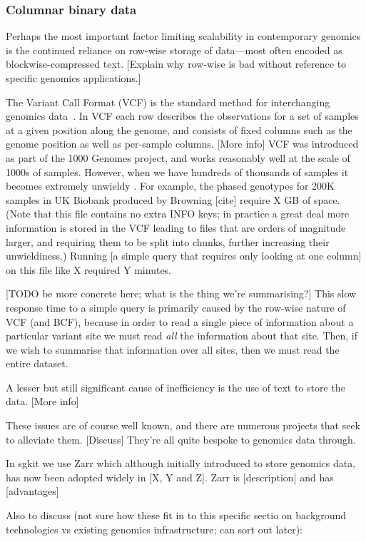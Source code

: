 \documentclass[9pt,lineno]{elife}
\begin{document}
\subsubsection{Columnar binary data}

Perhaps the most important factor limiting scalability in contemporary genomics
is the continued reliance on row-wise storage of data---most often
encoded as blockwise-compressed text.
[Explain why row-wise is bad without reference to specific genomics applications.]

The Variant Call Format (VCF) is the standard method for interchanging
genomics data~\citep{danecek2011variant}.
In VCF each row describes the observations for a set of samples
at a given position along the genome, and consists of fixed columns such as the
genome position as well as per-sample columns. [More info]
VCF was introduced as part of the 1000 Genomes project, and works reasonably
well at the scale of 1000s of samples. However, when we have hundreds of
thousands of samples it becomes extremely unwieldy
. For example, the
phased genotypes for 200K samples in UK Biobank produced by Browning [cite]
require X GB of space.
(Note that this file contains no extra INFO keys; in practice a great deal
more information is stored in the VCF leading to files that are orders of
magnitude larger, and requiring them to be split into chunks, further
increasing their unwieldiness.)
Running [a simple query that requires only looking at
one column] on this file like X required Y minutes.

[TODO be more concrete here; what is the thing we're summarising?]
This slow response time to a simple query is primarily caused by the row-wise
nature of VCF (and BCF), because in order to read a single piece of
information about a particular variant site we must read \emph{all}
the information
about that site. Then, if we wish to summarise that information over
all sites, then we must read the entire dataset.

A lesser but still significant cause of inefficiency is the use of
text to store the data. [More info]

These issues are of course well known, and there are numerous projects
that seek to alleviate them. [Discuss] They're all quite bespoke to genomics data
through.

In sgkit we use Zarr which although initially introduced to store
genomics data, has now been adopted widely in [X, Y and Z].
Zarr is [description] and has [advantages]

Also to discuss (not sure how these fit in to this specific sectio
on background technologies vs existing genomics infrastructure; can
sort out later):
\end{document}
